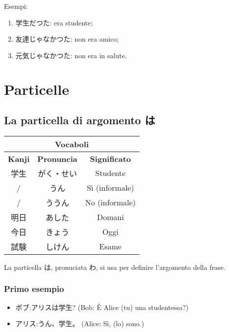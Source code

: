 \documentclass{article}
\let\ita\textitalian
\let\jap\textjapanese
\newcommand{\itabf}[1]{\ita{\textbf{#1}}}
\newenvironment{tabVoc}{\begin{center}\begin{japanese}\begin{longtable}{|c|c|c|}}{\end{longtable}\end{japanese}\end{center}}
\begin{document}
            Esempi:
            \begin{enumerate}
                \item \jap{学生だつた}: era studente;
                \item \jap{友達じゃなかつた}: non era amico;
                \item \jap{元気じゃなかつた}: non era in salute.
            \end{enumerate}

    \section{Particelle}

        \subsection{La particella di argomento \jap{は}}

            \begin{tabVoc}
                \hline
                \multicolumn{3}{|c|}{\itabf{Vocaboli}}\\
                \hline
                \itabf{Kanji} & \itabf{Pronuncia} & \itabf{Significato}\\
                \hline\hline
                学生 & がく・せい & \ita{Studente}\\
                \hline
                / & うん & \ita{Sì (informale)}\\
                \hline
                / & ううん & \ita{No (informale)}\\
                \hline
                明日 & あした & \ita{Domani}\\
                \hline
                今日 & きょう & \ita{Oggi}\\
                \hline
                試験 & しけん & \ita{Esame}\\
                \hline
            \end{tabVoc}

            La particella \jap{は}, pronuciata \jap{わ}, si usa per definire l'argomento della frase.

            \subsubsection*{Primo esempio}

                \begin{itemize}
                    \item \jap{ボブ:アリスは学生?} (Bob: È Alice (tu) una studentessa?)
                    \item \jap{アリス:うん、学生。} (Alice: Sì, (lo) sono.)
                \end{itemize}
\end{document}
